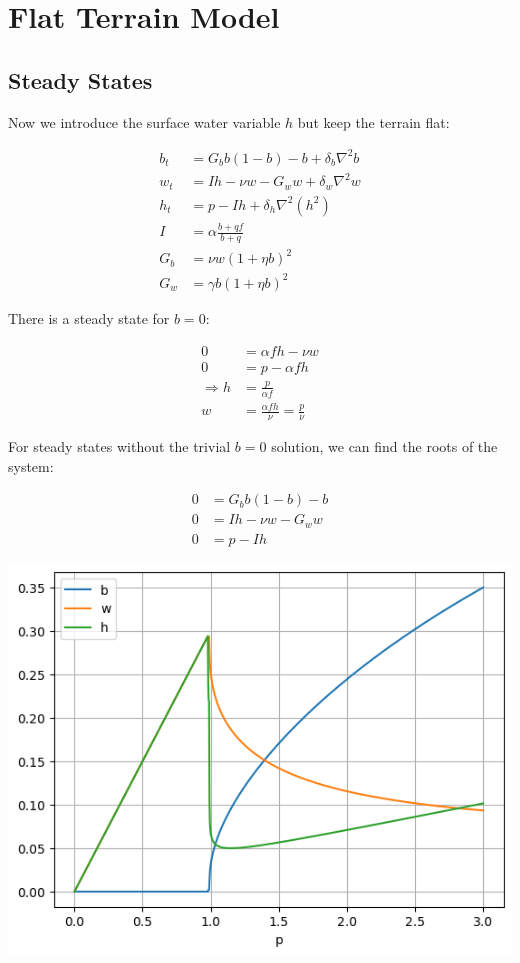 
\section{Flat Terrain Model}

\subsection{Steady States}

Now we introduce the surface water variable $h$ but keep the terrain
flat:

\begin{align*}
b_{t} & =G_{b}b\left(1-b\right)-b+\delta_{b}\nabla^{2}b\\
w_{t} & =Ih-\nu w-G_{w}w+\delta_{w}\nabla^{2}w\\
h_{t} & =p-Ih+\delta_{h}\nabla^{2}\left(h^{2}\right)\\
I & =\alpha\frac{b+qf}{b+q}\\
G_{b} & =\nu w\left(1+\eta b\right)^{2}\\
G_{w} & =\gamma b\left(1+\eta b\right)^{2}
\end{align*}

There is a steady state for $b=0$:

\begin{align*}
0 & =\alpha fh-\nu w\\
0 & =p-\alpha fh\\
\Rightarrow h & =\frac{p}{\alpha f}\\
w & =\frac{\alpha fh}{\nu}=\frac{p}{\nu}
\end{align*}

For steady states without the trivial $b=0$ solution, we can find
the roots of the system:

\begin{align*}
0 & =G_{b}b\left(1-b\right)-b\\
0 & =Ih-\nu w-G_{w}w\\
0 & =p-Ih
\end{align*}

\includegraphics{plots/pasted2.png}

